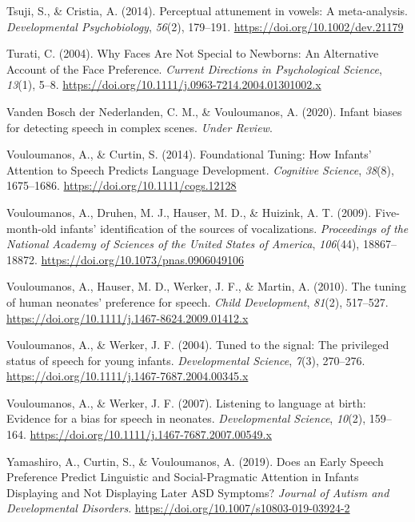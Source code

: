 \documentclass[man]{apa6}
\begin{document}
\leavevmode\hypertarget{ref-tsuji_perceptual_2014}{}%
Tsuji, S., \& Cristia, A. (2014). Perceptual attunement in vowels: A meta-analysis. \emph{Developmental Psychobiology}, \emph{56}(2), 179--191. \url{https://doi.org/10.1002/dev.21179}

\leavevmode\hypertarget{ref-turati_why_2004}{}%
Turati, C. (2004). Why Faces Are Not Special to Newborns: An Alternative Account of the Face Preference. \emph{Current Directions in Psychological Science}, \emph{13}(1), 5--8. \url{https://doi.org/10.1111/j.0963-7214.2004.01301002.x}

\leavevmode\hypertarget{ref-vanden_bosch_der_nederlanden_infant_2020}{}%
Vanden Bosch der Nederlanden, C. M., \& Vouloumanos, A. (2020). Infant biases for detecting speech in complex scenes. \emph{Under Review}.

\leavevmode\hypertarget{ref-vouloumanos_foundational_2014}{}%
Vouloumanos, A., \& Curtin, S. (2014). Foundational Tuning: How Infants' Attention to Speech Predicts Language Development. \emph{Cognitive Science}, \emph{38}(8), 1675--1686. \url{https://doi.org/10.1111/cogs.12128}

\leavevmode\hypertarget{ref-vouloumanos_five-month-old_2009}{}%
Vouloumanos, A., Druhen, M. J., Hauser, M. D., \& Huizink, A. T. (2009). Five-month-old infants' identification of the sources of vocalizations. \emph{Proceedings of the National Academy of Sciences of the United States of America}, \emph{106}(44), 18867--18872. \url{https://doi.org/10.1073/pnas.0906049106}

\leavevmode\hypertarget{ref-vouloumanos_tuning_2010}{}%
Vouloumanos, A., Hauser, M. D., Werker, J. F., \& Martin, A. (2010). The tuning of human neonates' preference for speech. \emph{Child Development}, \emph{81}(2), 517--527. \url{https://doi.org/10.1111/j.1467-8624.2009.01412.x}

\leavevmode\hypertarget{ref-vouloumanos_tuned_2004}{}%
Vouloumanos, A., \& Werker, J. F. (2004). Tuned to the signal: The privileged status of speech for young infants. \emph{Developmental Science}, \emph{7}(3), 270--276. \url{https://doi.org/10.1111/j.1467-7687.2004.00345.x}

\leavevmode\hypertarget{ref-vouloumanos_listening_2007}{}%
Vouloumanos, A., \& Werker, J. F. (2007). Listening to language at birth: Evidence for a bias for speech in neonates. \emph{Developmental Science}, \emph{10}(2), 159--164. \url{https://doi.org/10.1111/j.1467-7687.2007.00549.x}

\leavevmode\hypertarget{ref-yamashiro_does_2019}{}%
Yamashiro, A., Curtin, S., \& Vouloumanos, A. (2019). Does an Early Speech Preference Predict Linguistic and Social-Pragmatic Attention in Infants Displaying and Not Displaying Later ASD Symptoms? \emph{Journal of Autism and Developmental Disorders}. \url{https://doi.org/10.1007/s10803-019-03924-2}

\endgroup
\end{document}
